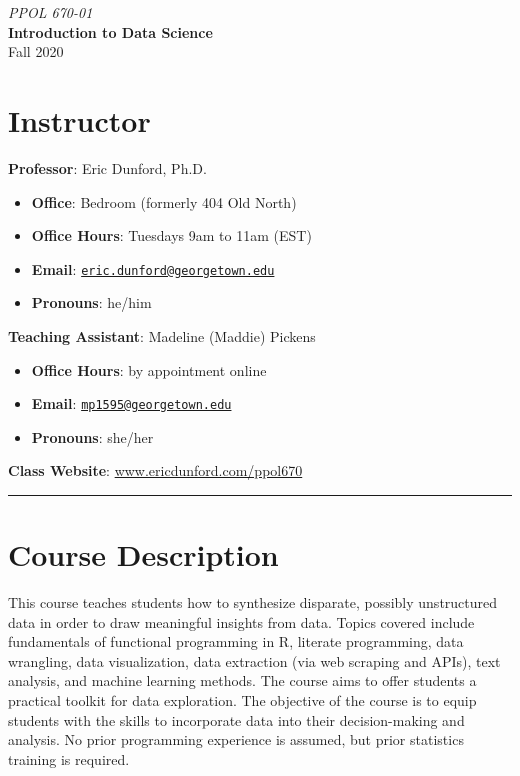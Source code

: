 \documentclass[
  12pt,
]{article}
\author{}
\date{\vspace{-2.5em}}
\providecommand{\tightlist}{%
  \setlength{\itemsep}{0pt}\setlength{\parskip}{0pt}}
\begin{document}
\begin{center}
 

\huge \textit{PPOL 670-01}\\
\huge\textbf{Introduction to Data Science}\\

\Large Fall 2020
\end{center}

\hypertarget{instructor}{%
\section{Instructor}\label{instructor}}

\textbf{Professor}: Eric Dunford, Ph.D.

\begin{itemize}
\tightlist
\item
  \textbf{Office}: Bedroom (formerly 404 Old North)
\item
  \textbf{Office Hours}: Tuesdays 9am to 11am (EST)
\item
  \textbf{Email}:
  \href{mailto:eric.dunford@georgetown.edu}{\nolinkurl{eric.dunford@georgetown.edu}}
\item
  \textbf{Pronouns}: he/him
\end{itemize}

\textbf{Teaching Assistant}: Madeline (Maddie) Pickens

\begin{itemize}
\tightlist
\item
  \textbf{Office Hours}: by appointment online
\item
  \textbf{Email}:
  \href{mailto:mp1595@georgetown.edu}{\nolinkurl{mp1595@georgetown.edu}}
\item
  \textbf{Pronouns}: she/her
\end{itemize}

\textbf{Class Website}: \url{www.ericdunford.com/ppol670}

\begin{center}\rule{0.5\linewidth}{0.5pt}\end{center}

\hypertarget{course-description}{%
\section{Course Description}\label{course-description}}

This course teaches students how to synthesize disparate, possibly
unstructured data in order to draw meaningful insights from data. Topics
covered include fundamentals of functional programming in R, literate
programming, data wrangling, data visualization, data extraction (via
web scraping and APIs), text analysis, and machine learning methods. The
course aims to offer students a practical toolkit for data exploration.
The objective of the course is to equip students with the skills to
incorporate data into their decision-making and analysis. No prior
programming experience is assumed, but prior statistics training is
required.
\end{document}
